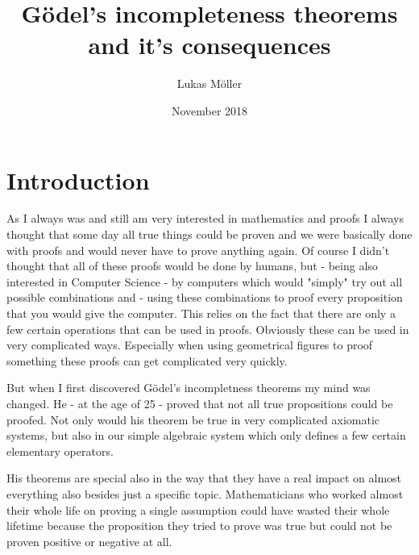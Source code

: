 \documentclass[english,12pt]{article}
\begin{document}

\author{Lukas Möller}
\title{Gödel's incompleteness theorems and it's consequences}
\date{November 2018}


\maketitle
\tableofcontents
\newpage

\section{Introduction}
As I always was and still am very interested in mathematics and proofs I always thought that some day all true things could be proven and we were basically done with proofs and would never have to prove anything again. Of course I didn't thought that all of these proofs would be done by humans, but - being also interested in Computer Science - by computers which would "simply" try out all possible combinations and - using these combinations to proof every proposition that you would give the computer. This relies on the fact that there are only a few certain operations that can be used in proofs. Obviously these can be used in very complicated ways. Especially when using geometrical figures to proof something these proofs can get complicated very quickly.

But when I first discovered Gödel's incompletness theorems my mind was changed. He - at the age of 25 - proved that not all true propositions could be proofed. Not only would his theorem be true in very complicated axiomatic systems, but also in our simple algebraic system which only defines a few certain elementary operators.

His theorems are special also in the way that they have a real impact on almost everything also besides just a specific topic. Mathematicians who worked almost their whole life on proving a single assumption could have wasted their whole lifetime because the proposition they tried to prove was true but could not be proven positive or negative at all.
\end{document}
